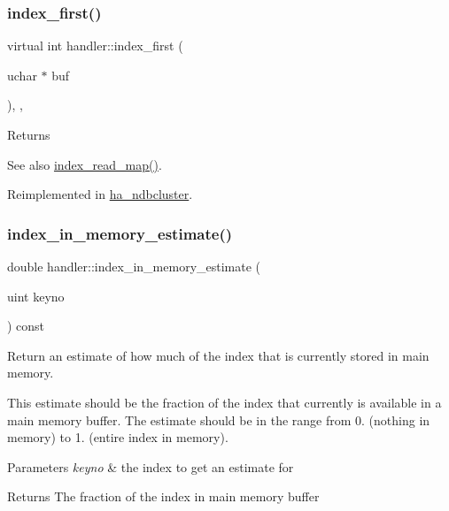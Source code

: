 \subsubsection{\texorpdfstring{index\+\_\+first()}{index\_first()}}
{\footnotesize\ttfamily virtual int handler\+::index\+\_\+first (\begin{DoxyParamCaption}\item[{uchar $\ast$}]{buf }\end{DoxyParamCaption})\hspace{0.3cm}{\ttfamily [inline]}, {\ttfamily [protected]}, {\ttfamily [virtual]}}

\begin{DoxyReturn}{Returns}

\end{DoxyReturn}
\begin{DoxySeeAlso}{See also}
\mbox{\hyperlink{classhandler_af8c2b258691e5baac8dd22d19c084b37}{index\+\_\+read\+\_\+map()}}. 
\end{DoxySeeAlso}


Reimplemented in \mbox{\hyperlink{classha__ndbcluster_a1d3598345c3543f684c566f79a61cedc}{ha\+\_\+ndbcluster}}.

\mbox{\label{classhandler_a375fdfc86f021f336777324dd5a98a02}} 
\subsubsection{\texorpdfstring{index\+\_\+in\+\_\+memory\+\_\+estimate()}{index\_in\_memory\_estimate()}}
{\footnotesize\ttfamily double handler\+::index\+\_\+in\+\_\+memory\+\_\+estimate (\begin{DoxyParamCaption}\item[{uint}]{keyno }\end{DoxyParamCaption}) const}

Return an estimate of how much of the index that is currently stored in main memory.

This estimate should be the fraction of the index that currently is available in a main memory buffer. The estimate should be in the range from 0. (nothing in memory) to 1. (entire index in memory).


\begin{DoxyParams}{Parameters}
{\em keyno} & the index to get an estimate for\\
\hline
\end{DoxyParams}
\begin{DoxyReturn}{Returns}
The fraction of the index in main memory buffer 
\end{DoxyReturn}
\mbox{\label{classhandler_aa1d62ffab7408a031b13e547eb58be09}} 
